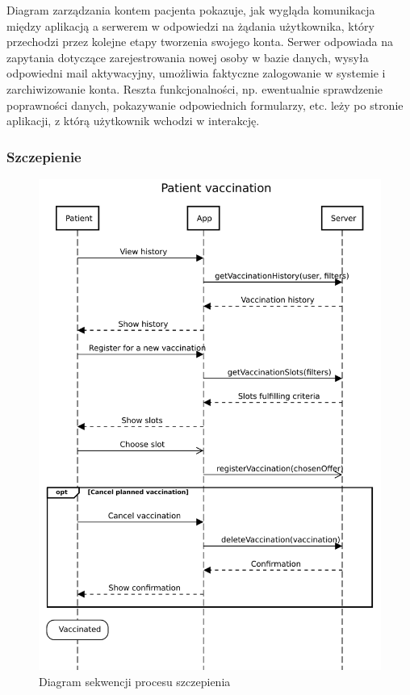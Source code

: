 \documentclass[a4paper,12pt,polish]{article}
\begin{document}
Diagram zarządzania kontem pacjenta pokazuje, jak wygląda komunikacja między aplikacją a serwerem w odpowiedzi na żądania użytkownika, który przechodzi przez kolejne etapy tworzenia swojego konta. Serwer odpowiada na zapytania dotyczące zarejestrowania nowej osoby w bazie danych, wysyła odpowiedni mail aktywacyjny, umożliwia faktyczne zalogowanie w systemie i zarchiwizowanie konta. Reszta funkcjonalności, np. ewentualnie sprawdzenie poprawności danych, pokazywanie odpowiednich formularzy, etc. leży po stronie aplikacji, z którą użytkownik wchodzi w interakcję.

\newpage
\subsubsection{Szczepienie}

\begin{figure}[!h]
    \centering
    \includegraphics[width=\textwidth,height=0.7\textheight,keepaspectratio]{Patient_vaccination.pdf} 
    \caption{Diagram sekwencji procesu szczepienia
    \label{fig:diagram-uml}}
\end{figure}
\end{document}
